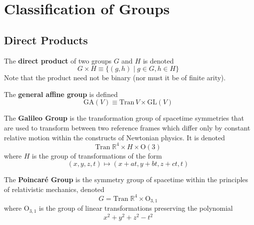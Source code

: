 \section{Classification of Groups} 

\subsection{Direct Products}

  \begin{definition}
    The \textbf{direct product} of two groups $G$ and $H$ is denoted
    \begin{equation}
      G \times H \equiv \{ (g, h)\;|\; g \in G, h \in H \}
    \end{equation}
    Note that the product need not be binary (nor must it be of finite arity). 
  \end{definition}

  \begin{example}
    The \textbf{general affine group} is defined 
    \begin{equation}
      \text{GA}(V) \equiv \text{Tran}\,V \times \text{GL}(V)
    \end{equation}
  \end{example}

  \begin{example}
    The \textbf{Galileo Group} is the transformation group of spacetime symmetries that are used to transform between two reference frames which differ only by constant relative motion within the constructs of Newtonian physics. It is denoted 
    \begin{equation}
      \text{Tran}\;\mathbb{R}^{4} \times H \times \text{O} (3)
    \end{equation}
    where $H$ is the group of transformations of the form 
    \begin{equation}
      (x, y, z, t) \longmapsto (x+at, y+bt, z+ct, t)
    \end{equation}
  \end{example}

  \begin{example}
    The \textbf{Poincaré Group} is the symmetry group of spacetime within the principles of relativistic mechanics, denoted
    \begin{equation}
      G = \text{Tran}\; \mathbb{R}^{4} \times \text{O}_{3,1}
    \end{equation}
    where O$_{3,1}$ is the group of linear transformations preserving the polynomial 
    \begin{equation}
      x^{2} + y^{2} + z^{2} - t^{2}
    \end{equation}
  \end{example} 

